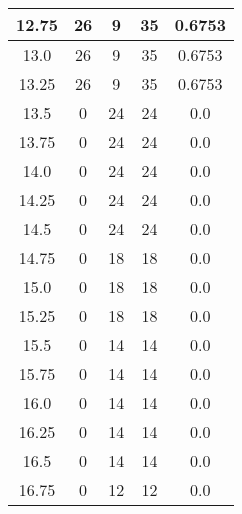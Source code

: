 \documentclass[letterpaper, 12pt]{article}
\begin{document}
\begin{longtable}{|c|c|c|c|c|}
\hline
12.75 & 26 & 9 & 35 & 0.6753 \\
\hline
13.0 & 26 & 9 & 35 & 0.6753 \\
\hline
13.25 & 26 & 9 & 35 & 0.6753 \\
\hline
13.5 & 0 & 24 & 24 & 0.0 \\
\hline
13.75 & 0 & 24 & 24 & 0.0 \\
\hline
14.0 & 0 & 24 & 24 & 0.0 \\
\hline
14.25 & 0 & 24 & 24 & 0.0 \\
\hline
14.5 & 0 & 24 & 24 & 0.0 \\
\hline
14.75 & 0 & 18 & 18 & 0.0 \\
\hline
15.0 & 0 & 18 & 18 & 0.0 \\
\hline
15.25 & 0 & 18 & 18 & 0.0 \\
\hline
15.5 & 0 & 14 & 14 & 0.0 \\
\hline
15.75 & 0 & 14 & 14 & 0.0 \\
\hline
16.0 & 0 & 14 & 14 & 0.0 \\
\hline
16.25 & 0 & 14 & 14 & 0.0 \\
\hline
16.5 & 0 & 14 & 14 & 0.0 \\
\hline
16.75 & 0 & 12 & 12 & 0.0 \\
\hline
\end{longtable}
\end{document}

